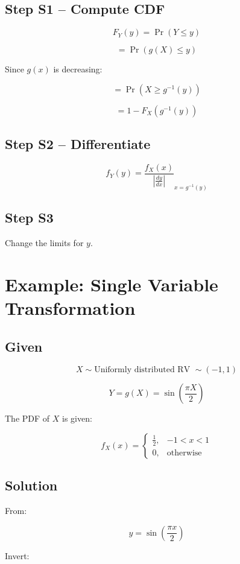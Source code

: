 \documentclass[12pt]{article}
\begin{document}
\subsection{Step S1 – Compute CDF}

\[
F_Y(y) = \Pr(Y \le y)
\]

\[
= \Pr(g(X) \le y)
\]

Since \( g(x) \) is decreasing:

\[
= \Pr(X \ge g^{-1}(y))
\]

\[
= 1 - F_X(g^{-1}(y))
\]

\subsection{Step S2 – Differentiate}

\[
\boxed{
f_Y(y)
=
\frac{f_X(x)}{\left|\frac{dy}{dx}\right|}_{x=g^{-1}(y)}
}
\]

\subsection{Step S3}

Change the limits for \( y \).

\section{Example: Single Variable Transformation}

\subsection{Given}

\[
X \sim \text{Uniformly distributed RV } \sim (-1,1)
\]

\[
Y = g(X) = \sin\left(\frac{\pi X}{2}\right)
\]

The PDF of \( X \) is given:

\[
f_X(x)=
\begin{cases}
\frac{1}{2}, & -1 < x < 1 \\
0, & \text{otherwise}
\end{cases}
\]

\subsection{Solution}

From:

\[
y = \sin\left(\frac{\pi x}{2}\right)
\]

Invert:
\end{document}
